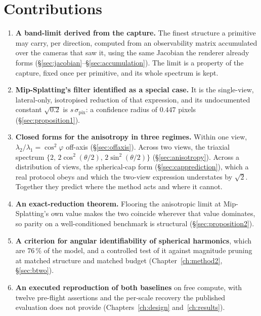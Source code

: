 \section{Contributions}

\begin{enumerate}[leftmargin=1.4em,itemsep=3pt]
  \item \textbf{A band-limit derived from the capture.} The finest structure a
        primitive may carry, per direction, computed from an observability
        matrix accumulated over the cameras that saw it, using the same Jacobian
        the renderer already forms
        (\S\ref{sec:jacobian}--\S\ref{sec:accumulation}). The limit is a
        property of the capture, fixed once per primitive, and its whole
        spectrum is kept.

  \item \textbf{Mip-Splatting's filter identified as a special case.} It is the
        single-view, lateral-only, isotropised reduction of that expression, and
        its undocumented constant $\sqrt{0.2}$ is $s\,\sigma_{\mathrm{pix}}$: a
        confidence radius of $0.447$ pixels (\S\ref{sec:proposition1}).

  \item \textbf{Closed forms for the anisotropy in three regimes.} Within one
        view, $\lambda_2/\lambda_1 = \cos^2\varphi$ off-axis
        (\S\ref{sec:offaxis}). Across two views, the triaxial spectrum
        $\{2,\,2\cos^2(\theta/2),\,2\sin^2(\theta/2)\}$
        (\S\ref{sec:anisotropy}). Across a distribution of views, the
        spherical-cap form (\S\ref{sec:capprediction}), which a real protocol
        obeys and which the two-view expression understates by $\sqrt{2}$.
        Together they predict where the method acts and where it cannot.

  \item \textbf{An exact-reduction theorem.} Flooring the anisotropic limit at
        Mip-Splatting's own value makes the two coincide wherever that value
        dominates, so parity on a well-conditioned benchmark is structural
        (\S\ref{sec:proposition2}).

  \item \textbf{A criterion for angular identifiability of spherical
        harmonics}, which are $76\,\%$ of the model, and a controlled test of it
        against magnitude pruning at matched structure and matched budget
        (Chapter~\ref{ch:method2}, \S\ref{sec:btwo}).

  \item \textbf{An executed reproduction of both baselines} on free compute,
        with twelve pre-flight assertions and the per-scale recovery the
        published evaluation does not provide (Chapters~\ref{ch:design}
        and~\ref{ch:results}).


\end{enumerate}

